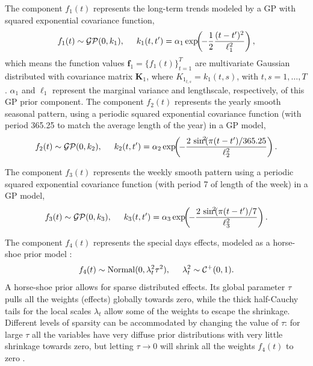 \documentclass[onecolumn,a4paper,11pt]{article}
\DeclareMathOperator{\GP}{\mathcal{GP}}
\DeclareMathOperator{\Normal}{Normal}
\begin{document}
The component $f_1(t)$ represents the long-term trends modeled by a GP with squared exponential covariance function,
%
\begin{equation*}
f_1(t) \sim \GP(0,k_1), \hspace{5mm} k_1(t,t') = \alpha_1 \exp\!\!\left(\!-\frac{1}{2} \frac{(t-t')^2}{\ell_1^2}\right), 
\end{equation*}
%
which means the function values $\bm{f}_1=\{f_1(t)\}_{t=1}^T$ are multivariate Gaussian distributed with covariance matrix $\bm{K}_1$, where $K_{1_{t,s}}=k_1(t,s)$, with $t,s=1,\dots,T$. $\alpha_1$ and $\ell_1$ represent the marginal variance and lengthscale, respectively, of this GP prior component. 
The component $f_2(t)$ represents the yearly smooth seasonal pattern, using a periodic squared exponential covariance function (with period 365.25 to match the average length of the year) in a GP model,
%
\begin{equation*}
f_2(t) \sim \GP(0,k_2), \hspace{5mm} k_2(t,t') = \alpha_2 \exp\!\!\left(\!-\frac{2\,\sin^{\!2}\!(\pi(t-t')/365.25}{\ell_2^2}\right).
\end{equation*}

The component $f_3(t)$ represents the weekly smooth pattern using a periodic squared exponential covariance function (with period 7 of length of the week) in a GP model,
%
\begin{equation*}
f_3(t) \sim \GP(0,k_3), \hspace{5mm} k_3(t,t') = \alpha_3 \exp\!\!\left(\!-\frac{2\,\sin^{\!2}\!(\pi(t-t')/7}{\ell_3^2}\right). 
\end{equation*}

The component $f_4(t)$ represents the special days effects, modeled as a horse-shoe prior model \citep{carvalho2010,piironen2017sparsity}:
%
\begin{equation*}
f_4(t) \sim \Normal(0,\lambda^2_t \tau^2), \hspace{5mm} \lambda^2_t \sim \mathcal{C}^{+}(0,1).
\end{equation*}
%
A horse-shoe prior allows for sparse distributed effects. Its global parameter $\tau$ pulls all the weights (effects) globally towards zero, while the thick half-Cauchy tails for the local scales $\lambda_t$ allow some of the weights to escape the shrinkage. Different levels of sparsity can be accommodated by changing the value of $\tau$: for large $\tau$ all the variables have very diffuse prior distributions with very little shrinkage towards zero, but letting $\tau \rightarrow 0$ will shrink all the weights $f_4(t)$ to zero \citep{piironen2016hyperprior}. 
\end{document}
